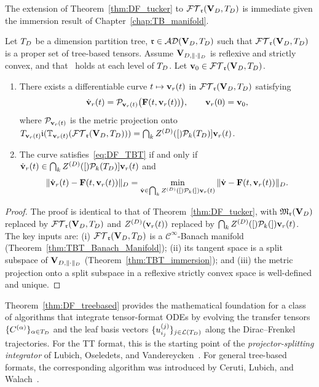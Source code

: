 The extension of Theorem~\ref{thm:DF_tucker} to $\mathcal{FT}_{\mathfrak{r}}(\mathbf{V}_D,T_D)$ is immediate
given the immersion result of Chapter~\ref{chap:TB_manifold}.

\begin{theorem}
\label{thm:DF_treebased}
Let $T_D$ be a dimension partition tree, $\mathfrak{r} \in \mathcal{AD}(\mathbf{V}_D,T_D)$ such that
$\mathcal{FT}_{\mathfrak{r}}(\mathbf{V}_D,T_D)$ is a proper set of tree-based tensors. Assume $\mathbf{V}_{D,\|\cdot\|_D}$ is
reflexive and strictly convex, and that \condINJ\ holds at each
level of $T_D$. Let $\mathbf{v}_0 \in \mathcal{FT}_{\mathfrak{r}}(\mathbf{V}_D,T_D)$.
\begin{enumerate}
\item[\textup{(Existence)}] There exists a differentiable curve
    $t \mapsto \mathbf{v}_r(t)$ in $\mathcal{FT}_{\mathfrak{r}}(\mathbf{V}_D,T_D)$ satisfying
    \begin{equation}
    \label{eq:DF_TBT}
        \dot{\mathbf{v}}_r(t) = \mathcal{P}_{\mathbf{v}_r(t)}\bigl(\mathbf{F}(t, \mathbf{v}_r(t))\bigr),
        \qquad \mathbf{v}_r(0) = \mathbf{v}_0,
    \end{equation}
    where $\mathcal{P}_{\mathbf{v}_r(t)}$ is the metric projection onto
    $T_{\mathbf{v}_r(t)}\mathfrak{i}(\mathbb{T}_{\mathbf{v}_r(t)}(\mathcal{FT}_{\mathfrak{r}}(\mathbf{V}_D,T_D)))
    = \bigcap_k Z^{(D)}([)\mathcal{P}_{k}(T_D)]{\mathbf{v}_r(t)}$.
\item[\textup{(Characterisation)}] The curve satisfies~\eqref{eq:DF_TBT}
    if and only if $\dot{\mathbf{v}}_r(t) \in \bigcap_k Z^{(D)}([)\mathcal{P}_{k}(T_D)]{\mathbf{v}_r(t)}$
    and
    \begin{equation}
    \label{eq:DF_TBT_char}
        \|\dot{\mathbf{v}}_r(t) - \mathbf{F}(t, \mathbf{v}_r(t))\|_D
        = \min_{\dot{\mathbf{v}} \in \bigcap_k Z^{(D)}([)\mathcal{P}_{k}(]){\mathbf{v}_r(t)}}
        \|\dot{\mathbf{v}} - \mathbf{F}(t, \mathbf{v}_r(t))\|_D.
    \end{equation}
\end{enumerate}
\end{theorem}

\begin{proof}
The proof is identical to that of Theorem~\ref{thm:DF_tucker}, with
$\mathfrak{M}_{\mathfrak{r}}(\mathbf{V}_D)$ replaced by $\mathcal{FT}_{\mathfrak{r}}(\mathbf{V}_D,T_D)$ and $Z^{(D)}(\mathbf{v}_r(t))$ replaced
by $\bigcap_k Z^{(D)}([)\mathcal{P}_{k}(]){\mathbf{v}_r(t)}$. The key inputs are:
(i) $\mathcal{FT}_{\mathfrak{r}}(\mathbf{V}_D,T_D)$ is a $\mathcal{C}^\infty$-Banach manifold
(Theorem~\ref{thm:TBT_Banach_Manifold}); (ii) its tangent space is
a split subspace of $\mathbf{V}_{D,\|\cdot\|_D}$ (Theorem~\ref{thm:TBT_immersion}); and
(iii) the metric projection onto a split subspace in a reflexive
strictly convex space is well-defined and unique.
\end{proof}

\begin{remark}
\label{rem:DF_algorithms}
Theorem~\ref{thm:DF_treebased} provides the mathematical foundation
for a class of algorithms that integrate tensor-format ODEs by evolving
the transfer tensors $\{C^{(\alpha)}\}_{\alpha \in T_D}$ and the leaf
basis vectors $\{u^{(j)}_{i_j}\}_{j \in \mathcal{L}(T_D)}$ along the
Dirac--Frenkel trajectories. For the TT format, this is the starting
point of the \emph{projector-splitting integrator} of Lubich, Oseledets,
and Vandereycken~\cite{LubichOseledetsVandereycken2015}. For general
tree-based formats, the corresponding algorithm was introduced by
Ceruti, Lubich, and Walach~\cite{CerutiLubichWalach2020}.
\end{remark}

